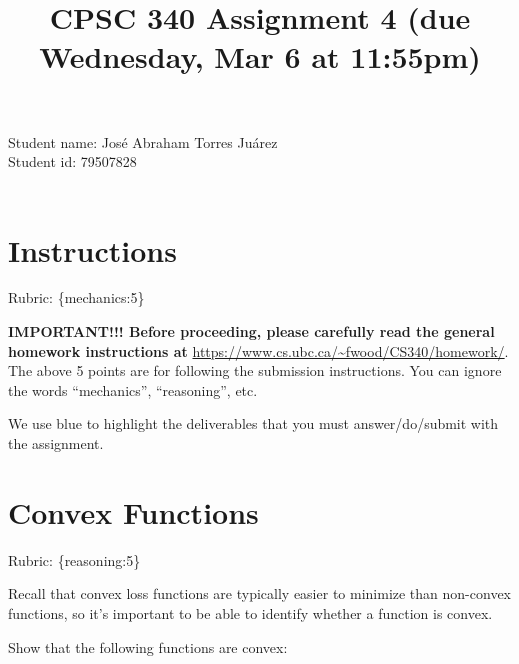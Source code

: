 \documentclass{article}
\def\rubric#1{\gre{Rubric: \{#1\}}}{}
\def\blu#1{{\color{blu}#1}}
\def\gre#1{{\color{gre}#1}}
\def\ans#1{{\color{ans}#1}}
\begin{document}
\title{CPSC 340 Assignment 4 (due Wednesday, Mar 6 at 11:55pm)}
\date{}
\maketitle

\vspace{-4em}
\ans{
    Student name: José Abraham Torres Juárez \\
    Student id: 79507828 \\ \\
}


\section*{Instructions}
\rubric{mechanics:5}

\textbf{IMPORTANT!!! Before proceeding, please carefully read the general homework instructions at} \url{https://www.cs.ubc.ca/~fwood/CS340/homework/}. The above 5 points are for following the submission instructions. You can ignore the words ``mechanics'', ``reasoning'', etc.

\vspace{1em}
We use \blu{blue} to highlight the deliverables that you must answer/do/submit with the assignment.


\section{Convex Functions}
\rubric{reasoning:5}

Recall that convex loss functions are typically easier to minimize than non-convex functions, so it's important to be able to identify whether a function is convex.

\blu{Show that the following functions are convex}:
\end{document}

